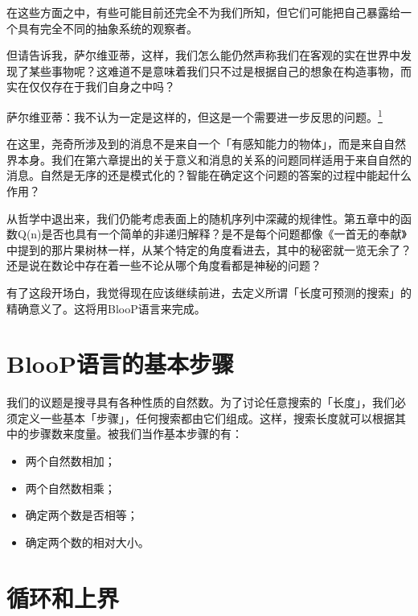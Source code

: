 \documentclass[
  12pt,
  twoside,
  openright,
  oldfontcommands,
]{memoir}
\providecommand{\tightlist}{%
  \setlength{\itemsep}{0pt}\setlength{\parskip}{0pt}}
\newenvironment{fsquote}{%
  \begin{mdframed}[style=gebquote]\kaitifamily\small%
}{%
  \end{mdframed}%
}
\begin{document}
\begin{fsquote}
在这些方面之中，有些可能目前还完全不为我们所知，但它们可能把自己暴露给一个具有完全不同的抽象系统的观察者。
\end{fsquote}

\begin{fsquote}
但请告诉我，萨尔维亚蒂，这样，我们怎么能仍然声称我们在客观的实在世界中发现了某些事物呢？这难道不是意味着我们只不过是根据自己的想象在构造事物，而实在仅仅存在于我们自身之中吗？
\end{fsquote}

\begin{fsquote}
萨尔维亚蒂：我不认为一定是这样的，但这是一个需要进一步反思的问题。\hyperref[fn:Chapter13-1]{\textsuperscript{1}}
\end{fsquote}

在这里，尧奇所涉及到的消息不是来自一个「有感知能力的物体」，而是来自自然界本身。我们在第六章提出的关于意义和消息的关系的问题同样适用于来自自然的消息。自然是无序的还是模式化的？智能在确定这个问题的答案的过程中能起什么作用？

从哲学中退出来，我们仍能考虑表面上的随机序列中深藏的规律性。第五章中的函数Q(n)是否也具有一个简单的非递归解释？是不是每个问题都像《一首无的奉献》中提到的那片果树林一样，从某个特定的角度看进去，其中的秘密就一览无余了？还是说在数论中存在着一些不论从哪个角度看都是神秘的问题？

有了这段开场白，我觉得现在应该继续前进，去定义所谓「长度可预测的搜索」的精确意义了。这将用BlooP语言来完成。

\section{BlooP语言的基本步骤}

我们的议题是搜寻具有各种性质的自然数。为了讨论任意搜索的「长度」，我们必须定义一些基本「步骤」，任何搜索都由它们组成。这样，搜索长度就可以根据其中的步骤数来度量。被我们当作基本步骤的有：

\begin{itemize}
\tightlist
\item
  两个自然数相加；
\item
  两个自然数相乘；
\item
  确定两个数是否相等；
\item
  确定两个数的相对大小。
\end{itemize}

\section{循环和上界}
\end{document}
